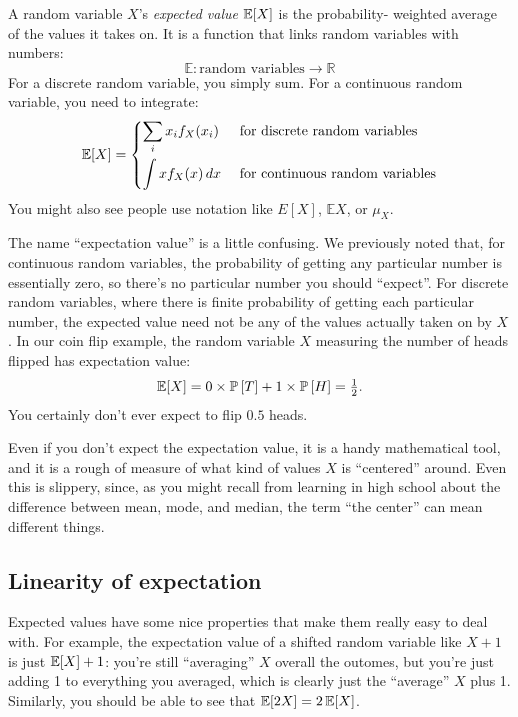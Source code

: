 A random variable $X$'s \emph{expected value} $\mathbb{E}\!\left[{X}\right]$ is the probability-
weighted average of the values it takes on. It is a function that links random
variables with numbers:
\begin{equation*}
\mathbb{E} : \text{random variables} \to \mathbb{R}
\end{equation*}
For a discrete random variable, you simply sum. For a continuous random
variable, you need to integrate:
\begin{equation}
\mathbb{E}\!\left[{X}\right] = \begin{dcases}
  \sum_i x_i f_X(x_i) & \text{ for discrete random variables} \\
  \int x f_X(x) \,dx & \text{ for continuous random variables}
\end{dcases}
\end{equation}
You might also see people use notation like $E[X]$, $\mathbb{E}X$, or $\mu_X$.


The name ``expectation value'' is a little confusing. We previously noted that,
for continuous random variables, the probability of getting any particular
number is essentially zero, so there's no particular number you should
``expect''. For discrete random variables, where there is finite probability
of getting each particular number, the expected value need not be any of the
values actually taken on by $X$. In our coin flip example, the random variable
$X$ measuring the number of heads flipped has expectation value:
\begin{equation}
\mathbb{E}\!\left[{X}\right] = 0 \times \mathbb{P}\left[{T}\right] + 1 \times \mathbb{P}\left[{H}\right] = \tfrac{1}{2}.
\end{equation}
You certainly don't ever expect to flip $0.5$ heads.

Even if you don't expect the expectation value, it is a handy mathematical
tool, and it is a rough of measure of what kind of values $X$ is ``centered''
around. Even this is slippery, since, as you might recall from learning in
high school about the difference between mean, mode, and median, the term ``the
center'' can mean different things.

\subsection{Linearity of expectation}

Expected values have some nice properties that make them really easy to deal
with. For example, the expectation value of a shifted random variable like $X +
1$ is just $\mathbb{E}\!\left[{X}\right] + 1$: you're still ``averaging'' $X$ overall the
outomes, but you're just adding 1 to everything you averaged, which is clearly
just the ``average'' $X$ plus 1. Similarly, you should be able to see that
$\mathbb{E}\!\left[{2X}\right] = 2 \,\mathbb{E}\!\left[{X}\right]$.

